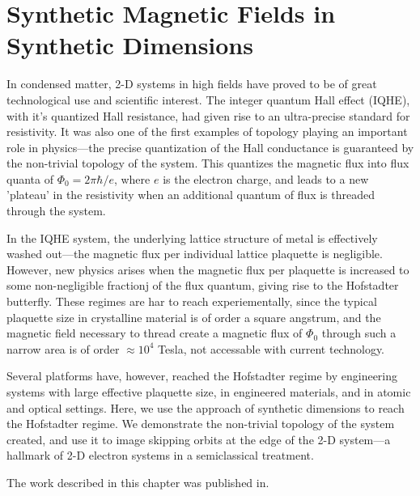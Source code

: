 \renewcommand{\thechapter}{5}

\chapter{Synthetic Magnetic Fields in Synthetic Dimensions}\label{chap:SynDim}


In condensed matter, 2-D systems in high fields have proved to be of great technological use and scientific interest. The integer quantum Hall effect (IQHE)\cite{Klitzing1980}, with it's quantized Hall resistance, had given rise to an ultra-precise standard for resistivity. It was also one of the first examples of topology playing an important role in physics---the precise quantization of the Hall conductance is guaranteed by the non-trivial topology of the system\cite{Thouless1982}. This quantizes the magnetic flux into flux quanta of $\Phi_0=2\pi\hbar/e$, where $e$ is the electron charge, and leads to a new 'plateau' in the resistivity when an additional quantum of flux is threaded through the system. 

In the IQHE system, the underlying lattice structure of metal is effectively washed out---the magnetic flux per individual lattice plaquette is negligible. However, new physics arises when the magnetic flux per plaquette is increased to some non-negligible fractionj of the flux quantum, giving rise to the Hofstadter butterfly\cite{Hofstadter1976}. These regimes are har to reach experiementally, since the typical plaquette size in crystalline material is of order a square angstrum, and the magnetic field necessary to thread create a magnetic flux of $\Phi_0$ through such a narrow area is of order $\approx10^4$ Tesla, not accessable with current technology. 

Several platforms have, however, reached the Hofstadter regime by engineering systems with large effective plaquette size, in engineered materials\cite{Geisler2004,Hunt2013}, and in atomic\cite{Jaksch2003,Aidelsburger2013,Miyake2013,Jotzu2014,Aidelsburger2014,Mancini2015} and optical\cite{Hafezi2013} settings. Here, we use the approach of synthetic dimensions \cite{Celi2014} to reach the Hofstadter regime. We demonstrate the non-trivial topology of the system created, and use it to image skipping orbits at the edge of the 2-D system---a hallmark of 2-D electron systems in a semiclassical treatment. 

The work described in this chapter was published in\cite{Stuhl2015}.

